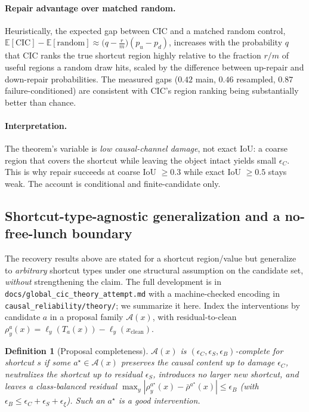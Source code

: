 \documentclass[11pt]{article}
\newtheorem{definition}{Definition}
\begin{document}
\paragraph{Repair advantage over matched random.}
Heuristically, the expected gap between CIC and a matched random control,
$\mathbb{E}[\mathrm{CIC}]-\mathbb{E}[\mathrm{random}]\approx
\big(q-\tfrac{r}{m}\big)(p_u-p_d)$, increases with the probability $q$ that CIC ranks
the true shortcut region highly relative to the fraction $r/m$ of useful regions a
random draw hits, scaled by the difference between up-repair and down-repair
probabilities. The measured gaps ($0.42$ main, $0.46$ resampled, $0.87$
failure-conditioned) are consistent with CIC's region ranking being substantially
better than chance.

\paragraph{Interpretation.}
The theorem's variable is \emph{low causal-channel damage}, not exact IoU: a coarse
region that covers the shortcut while leaving the object intact yields small
$\epsilon_C$. This is why repair succeeds at coarse IoU $\ge 0.3$ while exact IoU
$\ge 0.5$ stays weak. The account is conditional and finite-candidate only.

\subsection{Shortcut-type-agnostic generalization and a no-free-lunch boundary}
\label{sec:global}
The recovery results above are stated for a shortcut region/value but generalize to
\emph{arbitrary} shortcut types under one structural assumption on the candidate set,
\emph{without} strengthening the claim. The full development is in
\texttt{docs/global\_cic\_theory\_attempt.md} with a machine-checked encoding in
\texttt{causal\_reliability/theory/}; we summarize it here. Index the interventions by
candidate $a$ in a proposal family $\mathcal{A}(x)$, with residual-to-clean
$\rho^a_y(x)=\ell_y(T_a(x))-\ell_y(x_{\mathrm{clean}})$.

\begin{definition}[Proposal completeness]
$\mathcal{A}(x)$ is $(\epsilon_C,\epsilon_S,\epsilon_B)$-complete for shortcut $s$ if
some $a^\star\in\mathcal{A}(x)$ preserves the causal content up to damage $\epsilon_C$,
neutralizes the shortcut up to residual $\epsilon_S$, introduces no larger new
shortcut, and leaves a class-balanced residual
$\max_y|\rho^{a^\star}_y(x)-\bar\rho^{a^\star}(x)|\le\epsilon_B$ (with
$\epsilon_B\le\epsilon_C+\epsilon_S+\epsilon_\xi$). Such an $a^\star$ is a
\emph{good intervention}.
\end{definition}
\end{document}
